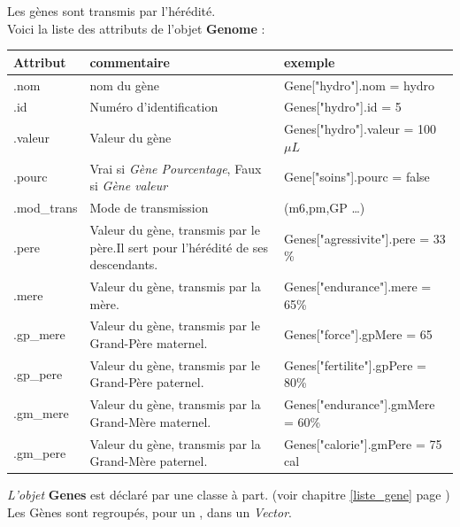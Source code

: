 \documentclass[french]{report}
\newlength{\du}\fi
\begin{document}
Les gènes sont transmis par l'hérédité.\\

Voici la liste des attributs de l'objet \textbf{Genome} :

\begin{table}[htdp]
	
	\begin{tabular}{|p{1.7cm}|p{8cm}|l|}
		\hline
		\rowcolor{yellow} \textbf{Attribut}  & \textbf{commentaire} & \textbf{exemple}\\
		\hline .nom & nom du gène & Gene["hydro"].nom = hydro\\
		\hline .id & Numéro d'identification & Genes["hydro"].id = 5\\
		\hline .valeur &  Valeur  du gène\footnotemark[1] &  Genes["hydro"].valeur = 100 $\mu L$ \\
		\hline .pourc & Vrai si \textit{Gène Pourcentage}, Faux si \textit{Gène valeur} & Gene["soins"].pourc = false\\
		\hline .mod\_trans & Mode de transmission\footnotemark[2] & (m6,pm,GP \dots)\\
		\hline .pere & Valeur du gène, transmis par le père.\footnotemark[3] Il sert pour l'hérédité de ses descendants. & Genes["agressivite"].pere = 33 \%\\
		\hline .mere & Valeur du gène, transmis par la mère.\footnotemark[3] & Genes["endurance"].mere = 65\%\\ 
		\hline .gp\_mere & Valeur du gène, transmis par le Grand-Père maternel.\footnotemark[3] & Genes["force"].gpMere = 65\\
		\hline .gp\_pere & Valeur du gène, transmis par le Grand-Père paternel.\footnotemark[3] & Genes["fertilite"].gpPere = 80\%\\
		\hline .gm\_mere & Valeur du gène, transmis par la Grand-Mère maternel.\footnotemark[3] & Genes["endurance"].gmMere = 60\%\\
		\hline .gm\_pere & Valeur du gène, transmis par la Grand-Mère paternel.\footnotemark[3] & Genes["calorie"].gmPere = 75 cal\\ \hline
		
	\end{tabular}
	
\end{table}

\textit{L'objet} \textbf{Genes} est déclaré par une classe à part.
(voir chapitre \ref{liste_gene} page \pageref{liste_gene}) \\ 
Les Gènes sont regroupés, pour un \CoCiX, dans un \emph{Vector}.\\
\end{document}
